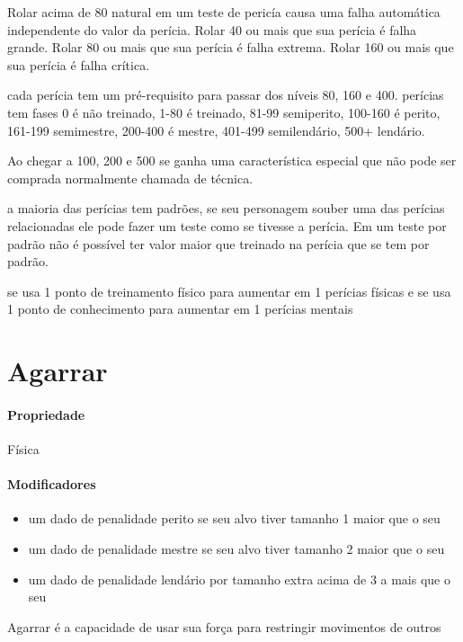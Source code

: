 Rolar acima de 80 natural em um teste de pericía causa uma 
falha automática independente do valor da perícia.
Rolar 40 ou mais que sua perícia é falha grande.
Rolar 80 ou mais que sua perícia é falha extrema.
Rolar 160 ou mais que sua perícia é falha crítica.

cada perícia tem um pré-requisito para passar dos níveis 80, 160 e 400.
perícias tem fases 0 é não treinado, 1-80 é treinado, 
81-99 semiperito, 100-160 é perito,
161-199 semimestre, 200-400 é mestre,
401-499 semilendário, 500+ lendário.

Ao chegar a 100, 200 e 500 se ganha uma característica especial
que não pode ser comprada normalmente chamada de técnica.

a maioria das perícias tem padrões, se seu personagem 
souber uma das perícias relacionadas ele pode fazer um teste
como se tivesse a perícia. Em um teste por padrão 
não é possível ter valor maior que treinado na perícia que 
se tem por padrão.

se usa 1 ponto de treinamento físico para aumentar em 1 perícias físicas
e se usa 1 ponto de conhecimento para aumentar em 1 perícias mentais
\section{Agarrar}
\paragraph{Propriedade} Física
\paragraph{Modificadores} 
\begin{itemize}
  \item um dado de penalidade perito se seu alvo tiver tamanho 1 maior que o seu 
  \item um dado de penalidade mestre se seu alvo tiver tamanho 2 maior que o seu 
  \item um dado de penalidade lendário por tamanho extra acima de 3 a mais que o seu 
\end{itemize}
Agarrar é a capacidade de usar sua força para restringir movimentos de outros
